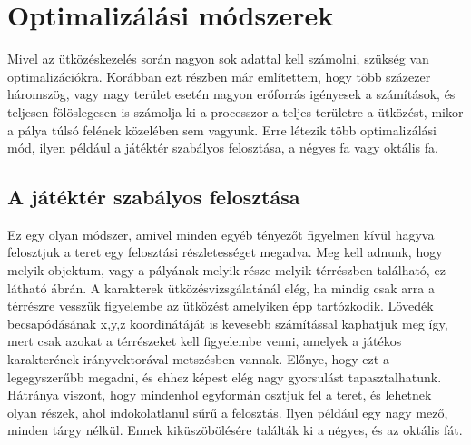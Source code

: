 \section{Optimalizálási módszerek}

Mivel az ütközéskezelés során nagyon sok adattal kell számolni, szükség van optimalizációkra. Korábban ezt részben már említettem, hogy több százezer háromszög, vagy nagy terület esetén nagyon erőforrás igényesek a számítások, és teljesen fölöslegesen is számolja ki a processzor a teljes területre a ütközést, mikor a pálya túlsó felének közelében sem vagyunk. Erre létezik több optimalizálási mód, ilyen például a játéktér szabályos felosztása, a négyes fa vagy oktális fa.

\subsection{A játéktér szabályos felosztása}

Ez egy olyan módszer, amivel minden egyéb tényezőt figyelmen kívül hagyva felosztjuk a teret egy felosztási részletességet megadva. Meg kell adnunk, hogy melyik objektum, vagy a pályának melyik része melyik térrészben található, ez látható  ábrán. A karakterek ütközésvizsgálatánál elég, ha mindig csak arra a térrészre vesszük figyelembe az ütközést amelyiken épp tartózkodik. Lövedék becsapódásának x,y,z koordinátáját is kevesebb számítással kaphatjuk meg így, mert csak azokat a térrészeket kell figyelembe venni, amelyek a játékos karakterének irányvektorával metszésben vannak. Előnye, hogy ezt a legegyszerűbb megadni, és ehhez képest elég nagy gyorsulást tapasztalhatunk. Hátránya viszont, hogy mindenhol egyformán osztjuk fel a teret, és lehetnek olyan részek, ahol indokolatlanul sűrű a felosztás. Ilyen például egy nagy mező, minden tárgy nélkül. Ennek kiküszöbölésére találták ki a négyes, és az oktális fát.

